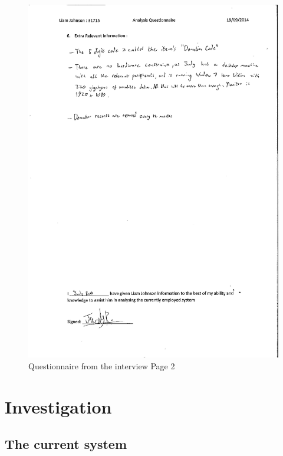 \begin{figure}[H]
    \includegraphics[width=\textwidth]{./Analysis/Appendix2.pdf}
    \caption{Questionnaire from the interview Page 2} \label{fig:SectionAppendix}
\end{figure}
\section{Investigation}

\subsection{The current system}

